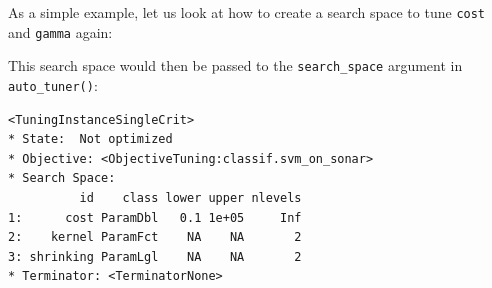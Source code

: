 As a simple example, let us look at how to create a search space to tune
\texttt{cost} and \texttt{gamma} again:

\begin{Shaded}
\begin{Highlighting}[]
\OtherTok{=} \NormalTok{(}
   \NormalTok{(} \NormalTok{, } \NormalTok{),}
   \NormalTok{(}\NormalTok{(}\NormalTok{, }\NormalTok{)),}
   \NormalTok{()}
\NormalTok{)}
\end{Highlighting}
\end{Shaded}

This search space would then be passed to the \texttt{search\_space}
argument in \texttt{auto\_tuner()}:

\begin{Shaded}
\begin{Highlighting}[]
\NormalTok{(}\NormalTok{, } 
\NormalTok{(}\NormalTok{), }
\end{Highlighting}
\end{Shaded}

\begin{verbatim}
<TuningInstanceSingleCrit>
* State:  Not optimized
* Objective: <ObjectiveTuning:classif.svm_on_sonar>
* Search Space:
          id    class lower upper nlevels
1:      cost ParamDbl   0.1 1e+05     Inf
2:    kernel ParamFct    NA    NA       2
3: shrinking ParamLgl    NA    NA       2
* Terminator: <TerminatorNone>
\end{verbatim}

